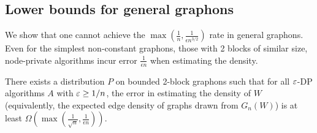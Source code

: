 \subsection{Lower bounds for general graphons}
\label{sec:lower-one-block}

We show that one cannot achieve the $\max(\frac 1 n, \frac 1
{\epsilon n^{3/2}})$ rate in general graphons. Even for the simplest
non-constant graphons, those with 2 blocks of similar size,
node-private algorithms incur error $\frac1 {\epsilon n}$ when
estimating the density. 

\begin{theorem}
  There exists a distribution $P$ on bounded 2-block graphons such that 
  for all $\varepsilon$-DP algorithms $A$ with $\varepsilon\geq 1/n$, the error in estimating the
  density of $W$ (equivalently, the expected edge density of graphs
  drawn from $G_n(W)$) is at least $\Omega(\max (\frac{1}{\sqrt{n}},
  \frac 1 {\epsilon n}))$.
\end{theorem}

